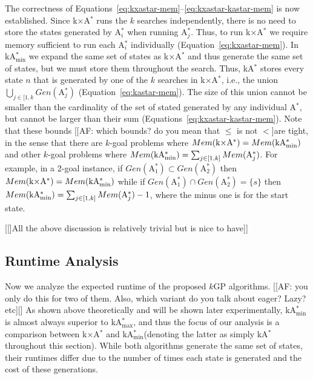 \documentclass[twoside,11pt]{article}
\newcommand{\kgs}{$k$GP\xspace}
\newcommand{\astar}{A$^*$\xspace}
\newcommand{\kastar}{kA$^*$\xspace}
\newcommand{\kastarvar}[1]{\textup{kA}$^*_{#1}$\xspace}
\newcommand{\kastarmin}{\kastarvar{\min}}
\newcommand{\kastarmax}{\kastarvar{\max}}
\newcommand{\kxastar}{k$\times$A$^*$\xspace}
\newcommand{\astari}[1]{A$^*_{#1}$\xspace}
\begin{document}
The correctness of Equations~\eqref{eq:kxastar-mem}--\eqref{eq:kxastar-kastar-mem} is now established.
Since \kxastar runs the $k$ searches independently, there is no need to store the states generated by \astari{i} when running \astari{j}.
Thus, to run \kxastar we require memory sufficient to run each \astari{i} individually (Equation~\eqref{eq:kxastar-mem}).
In \kastarmin we expand the same set of states as \kxastar and thus generate the same set of states, but we must store them throughout the search.
Thus, \kastar stores every state $n$ that is  generated by one of the $k$ searches in \kxastar, i.e., the union $\bigcup_{j\in[1,k}Gen(\text{\astari{j}})$ (Equation~\eqref{eq:kastar-mem}).
The size of this union cannot be smaller than the cardinality of the set of stated generated by any individual \astar, but cannot be larger than their sum (Equations~\eqref{eq:kxastar-kastar-mem}).
Note that these bounds [[AF: which bounds? do you mean that $\leq$ is not $<$]are tight, in the sense that there are $k$-goal problems where $Mem(\text{\kxastar}) = Mem(\text{\kastarmin})$ and other $k$-goal problems where $Mem(\text{\kastarmin}) = \sum_{j\in[1,k]} Mem(\text{\astari{j}})$.
For example, in a 2-goal instance, if $Gen(\text{\astari{1}})\subset Gen(\text{\astari{2}})$ then $Mem(\text{\kxastar}) = Mem(\text{\kastarmin})$ while if $Gen(\text{\astari{1}})\cap Gen(\text{\astari{2}})=\{s\}$ then $Mem(\text{\kastarmin}) = \sum_{j\in[1,k]} Mem(\text{\astari{j}})-1$, where the minus one is for the start state. %

[[]All the above discussion is relatively trivial but is nice to have]]


\subsection{Runtime Analysis}

Now we analyze the expected runtime of the proposed \kgs algorithms. [[AF: you only do this for two of them. Also, which variant do you talk about eager? Lazy? etc][]
As shown above theoretically and will be shown later experimentally, \kastarmin is almost always superior to \kastarmax, and thus the focus of our analysis is a comparison between \kxastar and \kastarmin (denoting the latter as simply \kastar throughout this section). 
While both algorithms generate the same set of states, %
their runtimes differ due to the number of times each state is generated and the cost of these generations.
\end{document}
